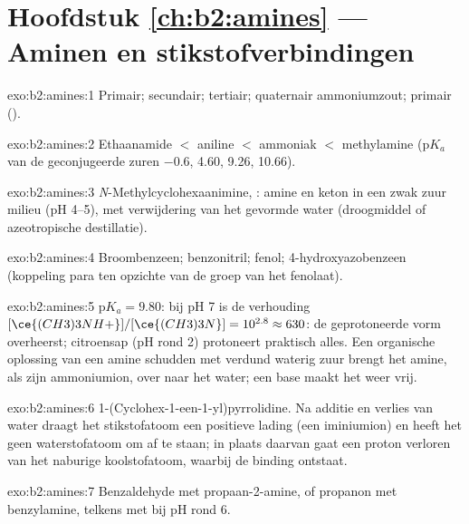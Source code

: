 \section*{Hoofdstuk \ref{ch:b2:amines} --- Aminen en stikstofverbindingen}

\begin{solution}{exo:b2:amines:1}
Primair; secundair; tertiair; quaternair ammoniumzout; primair ().
\end{solution}

\begin{solution}{exo:b2:amines:2}
Ethaanamide $<$ aniline $<$ ammoniak $<$ methylamine ($\mathrm pK_a$ van de geconjugeerde zuren
$-0.6$, 4.60, 9.26, 10.66).
\end{solution}

\begin{solution}{exo:b2:amines:3}
\textit{N}-Methylcyclohexaanimine, : amine en keton in een zwak zuur milieu
(pH 4--5), met verwijdering van het gevormde water (droogmiddel of azeotropische destillatie).
\end{solution}

\begin{solution}{exo:b2:amines:4}
Broombenzeen; benzonitril; fenol; 4-hydroxyazobenzeen  (koppeling para ten opzichte van de
groep  van het fenolaat).
\end{solution}

\begin{solution}{exo:b2:amines:5}
$\mathrm pK_a = 9.80$: bij pH 7 is de verhouding $[\ce{(CH3)3NH+}]/[\ce{(CH3)3N}] = 10^{2.8} \approx 630$: de
geprotoneerde vorm overheerst; citroensap (pH rond 2) protoneert praktisch alles. Een
organische oplossing van een amine schudden met verdund waterig zuur brengt het amine, als zijn ammoniumion,
over naar het water; een base maakt het weer vrij.
\end{solution}

\begin{solution}{exo:b2:amines:6}
1-(Cyclohex-1-een-1-yl)pyrrolidine. Na additie en verlies van water draagt het stikstofatoom een
positieve lading (een iminiumion) en heeft het geen waterstofatoom om af te staan; in plaats daarvan gaat een proton verloren van het naburige
koolstofatoom, waarbij de binding  ontstaat.
\end{solution}

\begin{solution}{exo:b2:amines:7}
Benzaldehyde met propaan-2-amine, of propanon met benzylamine, telkens met  bij pH
rond 6.
\end{solution}

